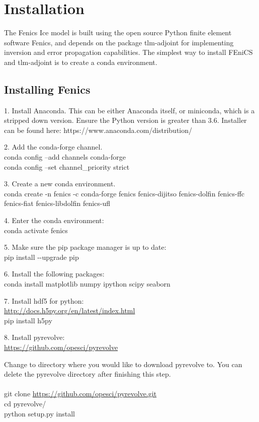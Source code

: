 \documentclass[11pt, reqno, nocenter]{article}
\begin{document}
\section{Installation}

The Fenics Ice model is built using the open source Python finite element software Fenics, and depends on the package tlm-adjoint for implementing inversion and error propagation capabilities. The simplest way to install FEniCS and tlm-adjoint is to create a conda environment. 

\subsection{Installing Fenics}
 
1. Install Anaconda. This can be either Anaconda itself, or miniconda, which is a stripped down version. Ensure the Python version is greater than 3.6. Installer can be found here: https://www.anaconda.com/distribution/ 

2. Add the conda-forge channel. \\
conda config --add channels conda-forge \\
conda config --set channel\_priority strict

3. Create a new conda environment. \\
conda create -n fenics -c conda-forge fenics fenics-dijitso fenics-dolfin fenics-ffc fenics-fiat fenics-libdolfin fenics-ufl

4. Enter the conda environment: \\
conda activate fenics

5. Make sure the pip package manager is up to date: \\
pip install -{}-upgrade pip

6. Install the following packages: \\
conda install matplotlib numpy ipython scipy seaborn

7. Install hdf5 for python: \\
\url{http://docs.h5py.org/en/latest/index.html} \\
pip install h5py

8. Install pyrevolve: \\
\url{https://github.com/opesci/pyrevolve}

Change to directory where you would like to download pyrevolve to. You can delete the pyrevolve directory after finishing this step. \\ \\
git clone \url{https://github.com/opesci/pyrevolve.git} \\
cd pyrevolve/ \\
python setup.py install
\end{document}
